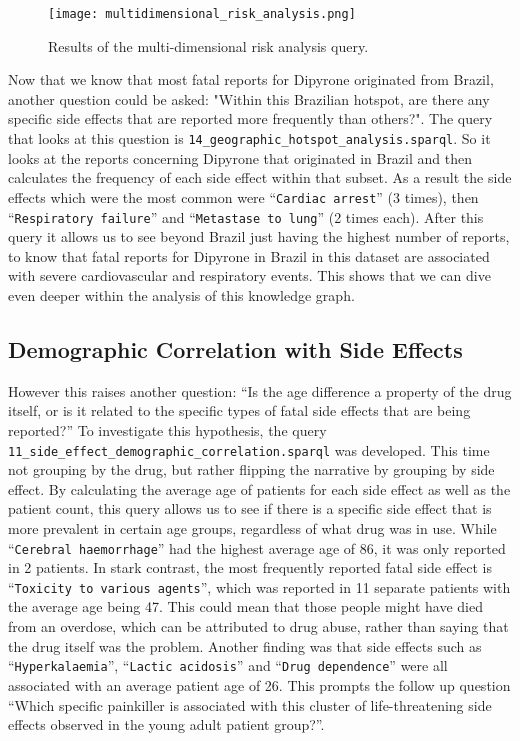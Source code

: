 \begin{figure}[H]
\centering
\texttt{[image: multidimensional\_risk\_analysis.png]} %
\caption{Results of the multi-dimensional risk analysis query.}
\label{fig:multidim_results}
\end{figure}

Now that we know that most fatal reports for Dipyrone originated from Brazil, another question could be asked: "Within this Brazilian hotspot, are there any specific side effects that are reported more frequently than others?". The query that looks at this question is \nolinkurl{14_geographic_hotspot_analysis.sparql}. So it looks at the reports concerning Dipyrone that originated in Brazil and then calculates the frequency of each side effect within that subset. As a result the side effects which were the most common were ``\texttt{Cardiac arrest}'' (3 times), then ``\texttt{Respiratory failure}'' and ``\texttt{Metastase to lung}'' (2 times each). After this query it allows us to see beyond Brazil just having the highest number of reports, to know that fatal reports for Dipyrone in Brazil in this dataset are associated with severe cardiovascular and respiratory events. This shows that we can dive even deeper within the analysis of this knowledge graph.

\subsection{Demographic Correlation with Side Effects}
However this raises another question: “Is the age difference a property of the drug itself, or is it related to the specific types of fatal side effects that are being reported?” To investigate this hypothesis, the query \nolinkurl{11_side_effect_demographic_correlation.sparql} was developed. This time not grouping by the drug, but rather flipping the narrative by grouping by side effect. By calculating the average age of patients for each side effect as well as the patient count,  this query allows us to see if there is a specific side effect that is more prevalent in certain age groups, regardless of what drug was in use. While ``\texttt{Cerebral haemorrhage}'' had the highest average age of 86, it was only reported in 2 patients. In stark contrast, the most frequently reported fatal side effect is ``\texttt{Toxicity to various agents}'', which was reported in 11 separate patients with the average age being 47. This could mean that those people might have died from an overdose, which can be attributed to drug abuse, rather than saying that the drug itself was the problem.  Another finding was that side effects such as ``\texttt{Hyperkalaemia}'', ``\texttt{Lactic acidosis}'' and ``\texttt{Drug dependence}'' were all associated with an average patient age of 26. This prompts the follow up question “Which specific painkiller is associated with this cluster of life-threatening side effects observed in the young adult patient group?”.

